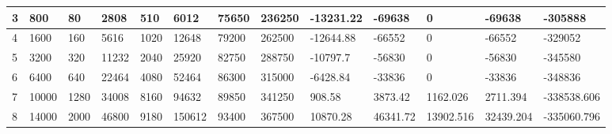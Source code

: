 \begin{table}[]
{\begin{tabular}{|l|l|l|l|l|l|l|l|l|l|l|l|l|}
        3     & 800       & 80            & 2808                                                  & 510                                                            & 6012                                                     & 75650                                                      & 236250                                                          & -13231.22  & -69638      & 0             & -69638           & -305888         \\ \hline
        4     & 1600      & 160           & 5616                                                  & 1020                                                           & 12648                                                    & 79200                                                      & 262500                                                          & -12644.88  & -66552      & 0             & -66552           & -329052         \\ \hline
        5     & 3200      & 320           & 11232                                                 & 2040                                                           & 25920                                                    & 82750                                                      & 288750                                                          & -10797.7   & -56830      & 0             & -56830           & -345580         \\ \hline
        6     & 6400      & 640           & 22464                                                 & 4080                                                           & 52464                                                    & 86300                                                      & 315000                                                          & -6428.84   & -33836      & 0             & -33836           & -348836         \\ \hline
        7     & 10000     & 1280          & 34008                                                 & 8160                                                           & 94632                                                    & 89850                                                      & 341250                                                          & 908.58     & 3873.42     & 1162.026      & 2711.394         & -338538.606     \\ \hline
        8     & 14000     & 2000          & 46800                                                 & 9180                                                           & 150612                                                   & 93400                                                      & 367500                                                          & 10870.28   & 46341.72    & 13902.516     & 32439.204        & -335060.796     \\ \hline

\end{tabular}}
\end{table}
